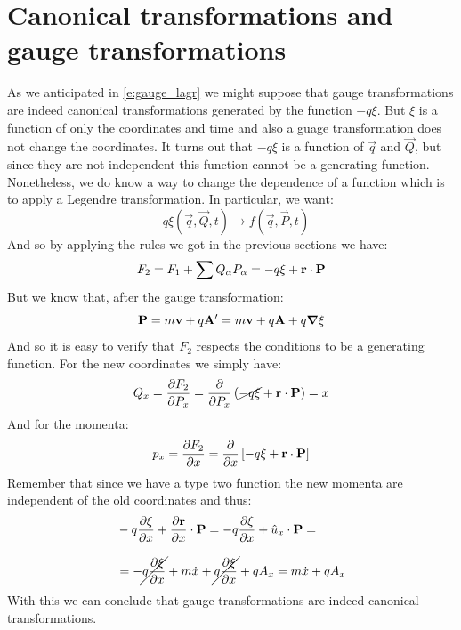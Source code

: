 \section{Canonical transformations and gauge transformations}
As we anticipated in \eqref{e:gauge_lagr} we might suppose that gauge transformations are indeed canonical transformations generated by the function $-q\xi$. But $\xi$ is a function of only the coordinates and time and also a guage transformation does not change the coordinates. It turns out that $-q\xi$ is a function of $\vec{q}$ and $\vec{Q}$, but since they are not independent this function cannot be a generating function. Nonetheless, we do know a way to change the dependence of a function which is to apply a Legendre transformation. In particular, we want:
\begin{equation}
  -q\xi (\vec{q},\vec{Q},t) \longrightarrow f (\vec{q},\vec{P},t)
\end{equation}
And so by applying the rules we got in the previous sections we have:
\begin{equation}
  F_2 = F_1 + \displaystyle\sum Q_{\alpha}P_{\alpha} = -q\xi + \vb{r}\cdot \vb{P}
\end{equation}
But we know that, after the gauge transformation:
\begin{equation}
  \vb{P} = m\vb{v} + q\vb{A}' = m\vb{v} + q\vb{A} + q\grad{\xi}
\end{equation}
And so it is easy to verify that $F_2$ respects the conditions to be a generating function. For the new coordinates we simply have:
\begin{equation}
  Q_{x} = \pdv{F_2}{P_x} = \pdv{}{P_x}\brackets{\cancel{-q\xi} + \vec{r}\cdot \vec{P}} = x
\end{equation}
And for the momenta:
\begin{equation}
  p_x = \pdv{F_2}{x} = \pdv{}{x}\sqbr{-q\xi + \vec{r}\cdot \vec{P}}
\end{equation}
Remember that since we have a type two function the new momenta are independent of the old coordinates and thus:
\begin{equation}
  \begin{split}
    &-q\pdv{\xi}{x} + \pdv{\vec{r}}{x} \cdot \vec{P} = -q\pdv{\xi}{x} + \hat{u}_x \cdot \vec{P} = \\[8pt]
    &= -\cancel{q\pdv{\xi}{x}} + m\dot{x} + \cancel{q\pdv{\xi}{x}} + qA_x = m\dot{x} + qA_x
  \end{split}
\end{equation}
With this we can conclude that gauge transformations are indeed canonical transformations.

